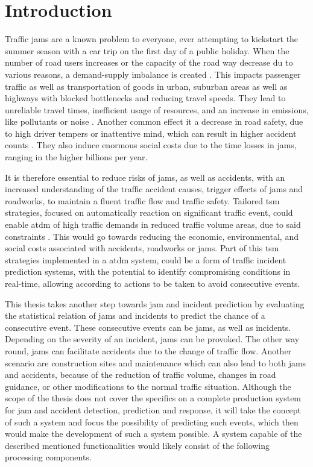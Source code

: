 \documentclass[a4paper,12pt]{report}
\begin{document}
\chapter{Introduction}
\setcounter{page}{1}
Traffic \glspl{jam} are a known problem to everyone, ever attempting to kickstart the summer season with a car trip on the first day of a public holiday. When the number of road users increases or the capacity of the road way decrease du to various reasons, a demand-supply imbalance is created \cite{Tang2019}. This impacts passenger traffic as well as transportation of goods in urban, suburban areas as well as highways with blocked bottlenecks and reducing travel speeds. They lead to unreliable travel times, inefficient usage of resources, and an increase in emissions, like pollutants or noise \cite{FHA2011}. Another common effect it a decrease in road safety, due to high driver tempers or inattentive mind, which can result in higher accident counts \cite{Sun2016}. They also induce enormous social costs due to the time losses in \glspl{jam}, ranging in the higher billions per year. \cite{RetallackOstendorf2019,BardtFritsch2014,ADAC2019}

It is therefore essential to reduce risks of \glspl{jam}, as well as accidents, with an increased understanding of the traffic accident causes, trigger effects of \glspl{jam} and roadworks, to maintain a fluent traffic flow and traffic safety. Tailored \acrfull{tsm} strategies, focused on automatically reaction on significant traffic event, could enable \acrfull{atdm} of high traffic demands in reduced traffic volume areas, due to said constraints \cite{Tang2019}. This would go towards reducing the economic, environmental, and social costs associated with accidents, roadworks or \glspl{jam}. Part of this \acrshort{tsm} strategies implemented in a \acrshort{atdm} system, could be a form of traffic incident prediction systems, with the potential to identify compromising conditions in real-time, allowing according to actions to be taken to avoid consecutive events. \cite{RetallackOstendorf2019} 

\bigskip

This thesis takes another step towards \gls{jam} and incident prediction by evaluating the statistical relation of \glspl{jam} and incidents to predict the chance of a consecutive event. These consecutive events can be \glspl{jam}, as well as incidents. Depending on the severity of an incident, \glspl{jam} can be provoked. The other way round, \glspl{jam} can facilitate accidents due to the change of traffic flow. Another scenario are construction sites and maintenance which can also lead to both \glspl{jam} and accidents, because of the reduction of traffic volume, changes in road guidance, or other modifications to the normal traffic situation. Although the scope of the thesis does not cover the specifics on a complete production system for \gls{jam} and accident detection, prediction and response, it will take the concept of such a system and focus the possibility of predicting such events, which then would make the development of such a system possible. 
A system capable of the described mentioned functionalities would likely consist of the following processing components.
\end{document}
